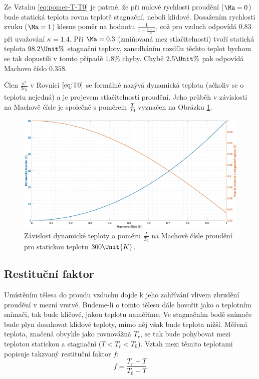     Ze Vztahu \ref{eq:pomer-T-T0} je patrné, že při nulové rychlosti proudění ($\Ma = 0$) bude statická teplota rovna teplotě stagnační, neboli klidové. Dosažením rychlosti zvuku ($\Ma = 1$) klesne poměr na hodnotu $\frac{1}{1+\frac{\kappa - 1}{2}}$, což pro vzduch odpovídá $0.83$ při uvažování $\kappa = 1.4$. Při $\Ma = 0.3$ (zmiňovaná mez stlačitelnosti) tvoří statická teplota $98.2 \Unit{\%}$ stagnační teploty, zanedbáním rozdílu těchto teplot bychom se tak dopustili v tomto případě $1.8\%$ chyby. Chybě $2.5 \Unit{\%}$ pak odpovídá Machovo číslo $0.358$.

    \clearpage

    Člen $\frac{u^2}{2 c_p}$ v Rovnici $\ref{eq:T0}$ se formálně nazývá dynamická teplota (ačkoliv se o teplotu nejedná) a je projevem stlačitelnosti proudění. Jeho průběh v závislosti na Machově čísle je společně s poměrem $\frac{T}{T0}$ vyznačen na Obrázku \ref{fig:pomer-T-T0}.

    \begin{figure}[ht!]
        \centering
        \includegraphics[width=\textwidth]{100_MERENI_TEPLOT/pomer_T_T0.eps}
        \caption{Závislost dynamické teploty a poměru $\frac{T}{T_0}$ na Machově čísle proudění pro statickou teplotu $300 \Unit{K}$.}
        \label{fig:pomer-T-T0}
    \end{figure}

    \subsection{Restituční faktor}

    Umístěním tělesa do proudu vzduchu dojde k jeho zahřívání vlivem zbrzdění proudění v mezní vrstvě. Budeme-li o tomto tělesu dále hovořit jako o teplotním snímači, tak bude klíčové, jakou teplotu naměříme. Ve stagnačním bodě snímače bude plyn dosahovat klidové teploty, mimo něj však bude teplota nižší. Měřená teplota, značená obvykle jako rovnovážná $T_r$, se tak bude pohybovat mezi teplotou statickou a stagnační ($T < T_r < T_0$). Vztah mezi těmito teplotami popisuje takzvaný restituční faktor $f$:
    \begin{equation} \label{eq:restitucni-faktor}
        f = \frac{T_r - T}{T_0 - T}
    \end{equation}


